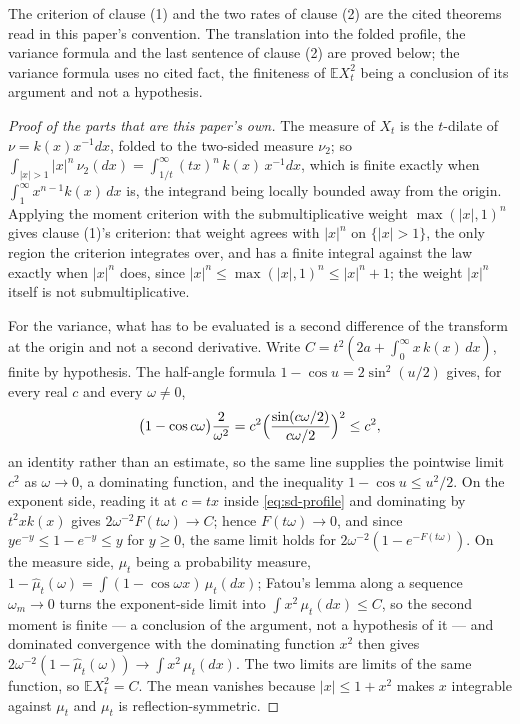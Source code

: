 The criterion of clause (1) and the two rates of clause (2) are the cited theorems read in
this paper's convention. The translation into the folded profile, the variance formula and
the last sentence of clause (2) are proved below; the variance formula uses no cited fact, the
finiteness of $\mathbb{E}X_t^2$ being a conclusion of its argument and not a hypothesis.

\begin{proof}[Proof of the parts that are this paper's own]
The \Levy{} measure of $X_t$ is the $t$-dilate of $\nu = k(x)x^{-1}dx$, folded to the two-sided
measure $\nu_2$; so
$\int_{|x|>1}|x|^n\,\nu_2(dx) = \int_{1/t}^\infty (tx)^n\,k(x)\,x^{-1}dx$, which is finite
exactly when $\int_1^\infty x^{n-1}k(x)\,dx$ is, the integrand being locally bounded away from
the origin. Applying the moment criterion with the submultiplicative weight $\max(|x|,1)^n$
gives clause (1)'s criterion: that weight agrees with $|x|^n$ on $\{|x| > 1\}$, the only region
the criterion integrates over, and has a finite integral against the law exactly when $|x|^n$
does, since $|x|^n \le \max(|x|,1)^n \le |x|^n + 1$; the weight $|x|^n$ itself is not
submultiplicative.

For the variance, what has to be evaluated is a second difference of the transform at the
origin and not a second derivative. Write $C = t^2(2a + \int_0^\infty x\,k(x)\,dx)$, finite by
hypothesis. The half-angle formula $1 - \cos u = 2\sin^2(u/2)$ gives, for every real $c$ and
every $\omega \ne 0$,
\[
  \bigl(1 - \cos c\omega\bigr)\frac{2}{\omega^2}
   = c^2\Bigl(\frac{\sin(c\omega/2)}{c\omega/2}\Bigr)^2 \le c^2 ,
\]
an identity rather than an estimate, so the same line supplies the pointwise limit $c^2$ as
$\omega \to 0$, a dominating function, and the inequality $1 - \cos u \le u^2/2$. On the
exponent side, reading it at $c = tx$ inside \ref{eq:sd-profile} and dominating by $t^2xk(x)$
gives $2\omega^{-2}F(t\omega) \to C$; hence $F(t\omega) \to 0$, and since
$ye^{-y} \le 1 - e^{-y} \le y$ for $y \ge 0$, the same limit holds for
$2\omega^{-2}(1 - e^{-F(t\omega)})$. On the measure side, $\mu_t$ being a probability measure,
$1 - \hat\mu_t(\omega) = \int(1 - \cos\omega x)\,\mu_t(dx)$; Fatou's lemma along a sequence
$\omega_m \to 0$ turns the exponent-side limit into $\int x^2\,\mu_t(dx) \le C$, so the second
moment is finite --- a conclusion of the argument, not a hypothesis of it --- and dominated
convergence with the dominating function $x^2$ then gives
$2\omega^{-2}(1 - \hat\mu_t(\omega)) \to \int x^2\,\mu_t(dx)$. The two limits are limits of the
same function, so $\mathbb{E}X_t^2 = C$. The mean vanishes because $|x| \le 1 + x^2$ makes $x$
integrable against $\mu_t$ and $\mu_t$ is reflection-symmetric.


\end{proof}
